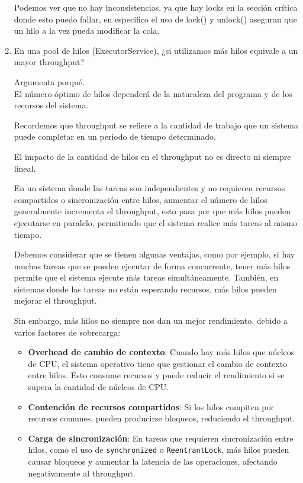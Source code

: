 \begin{enumerate}
Podemos ver que no hay inconsistencias, ya que hay locks en la sección crítica donde esto puedo fallar, en especifico el uso de lock()  y unlock() aseguran que un hilo a la vez pueda modificar la cola.
\hfill

\hfill

\item En una pool de hilos (ExecutorService), ¿si utilizamos más hilos equivale a un mayor throughput?

Argumenta porqué.\\

El número óptimo de hilos dependerá de la naturaleza del programa y de los recursos del sistema.

Recordemos que throughput se refiere a la cantidad de trabajo que un sistema puede completar en un periodo de tiempo determinado.

El impacto de la cantidad de hilos en el throughput no es directo ni siempre lineal. 

En un sistema donde las tareas son independientes y no requieren recursos compartidos o sincronización entre hilos, aumentar el número de hilos generalmente incrementa el throughput, esto pasa por que más hilos pueden ejecutarse en paralelo, permitiendo que el sistema realice más tareas al mismo tiempo.

Debemos considerar que se tienen algunas ventajas, como por ejemplo, si hay muchas tareas que se pueden ejecutar de forma concurrente, tener más hilos permite que el sistema ejecute más tareas simultáneamente. También, en sistemas donde las tareas no están esperando recursos, más hilos pueden mejorar el throughput.

Sin embargo, más hilos no siempre nos dan un mejor rendimiento, debido a varios factores de sobrecarga:


\begin{itemize}
    \item \textbf{Overhead de cambio de contexto}: Cuando hay más hilos que núcleos de CPU, el sistema operativo tiene que gestionar el cambio de contexto entre hilos. Esto consume recursos y puede reducir el rendimiento si se supera la cantidad de núcleos de CPU.
    \item \textbf{Contención de recursos compartidos}: Si los hilos compiten por recursos comunes, pueden producirse bloqueos, reduciendo el throughput.
    \item \textbf{Carga de sincronización}: En tareas que requieren sincronización entre hilos, como el uso de \texttt{synchronized} o \texttt{ReentrantLock}, más hilos pueden causar bloqueos y aumentar la latencia de las operaciones, afectando negativamente al throughput.
\end{itemize}


\end{enumerate}
